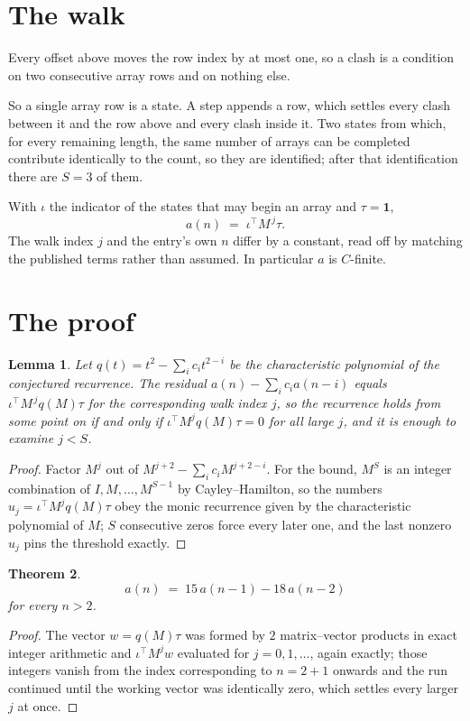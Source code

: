 \documentclass[11pt,a4paper]{article}
\theoremstyle{plain}
\newtheorem{theorem}{Theorem}
\newtheorem{lemma}[theorem]{Lemma}
\theoremstyle{definition}
\begin{document}
\section{The walk}

Every offset above moves the row index by at most one, so a clash is a condition on two
consecutive array rows and on nothing else.

So a single array row is a state. A step appends a row, which settles every clash between it
and the row above and every clash inside it. Two states from which, for every remaining length,
the same number of arrays can be completed contribute identically to the count, so they are
identified; after that identification there are $S=3$ of them.

With $\iota$ the indicator of the states that may begin an array and $\tau=\mathbf{1}$,
\[
a(n)\;=\;\iota^{\!\top}M^{\,j}\tau .
\]
The walk index $j$ and the entry's own $n$ differ by a constant, read off by matching the
published terms rather than assumed. In particular $a$ is $C$-finite.

\section{The proof}

\begin{lemma}\label{lem:crit}
Let $q(t)=t^{2}-\sum_i c_it^{2-i}$ be the characteristic polynomial of the
conjectured recurrence. The residual $a(n)-\sum_ic_ia(n-i)$ equals
$\iota^{\!\top}M^{\,j}q(M)\tau$ for the corresponding walk index $j$, so the recurrence
holds from some point on if and only if $\iota^{\!\top}M^{j}q(M)\tau=0$ for all large $j$,
and it is enough to examine $j<S$.
\end{lemma}

\begin{proof}
Factor $M^{j}$ out of $M^{j+2}-\sum_ic_iM^{j+2-i}$. For the bound, $M^{S}$
is an integer combination of $I,M,\dots,M^{S-1}$ by Cayley--Hamilton, so the numbers
$u_j=\iota^{\!\top}M^{j}q(M)\tau$ obey the monic recurrence given by the characteristic
polynomial of $M$; $S$ consecutive zeros force every later one, and the last nonzero $u_j$
pins the threshold exactly.
\end{proof}

\begin{theorem}
\[
a(n)\;=\;15\,a(n-1) - 18\,a(n-2)
\]
for every $n>2$.
\end{theorem}

\begin{proof}
The vector $w=q(M)\tau$ was formed by $2$ matrix--vector products in exact integer
arithmetic and $\iota^{\!\top}M^{j}w$ evaluated for $j=0,1,\dots$, again exactly; those
integers vanish from the index corresponding to $n=2+1$ onwards and the run continued
until the working vector was identically zero, which settles every larger $j$ at once.
\end{proof}
\end{document}
